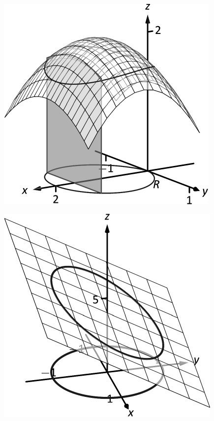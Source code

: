 \documentclass[10pt]{article}
\begin{document}
\includegraphics{figdouble_intro3_3DBW.pdf}
\texttt{}

\includegraphics{figdoublepol1_3DBW.pdf}
\texttt{}
\end{document}
